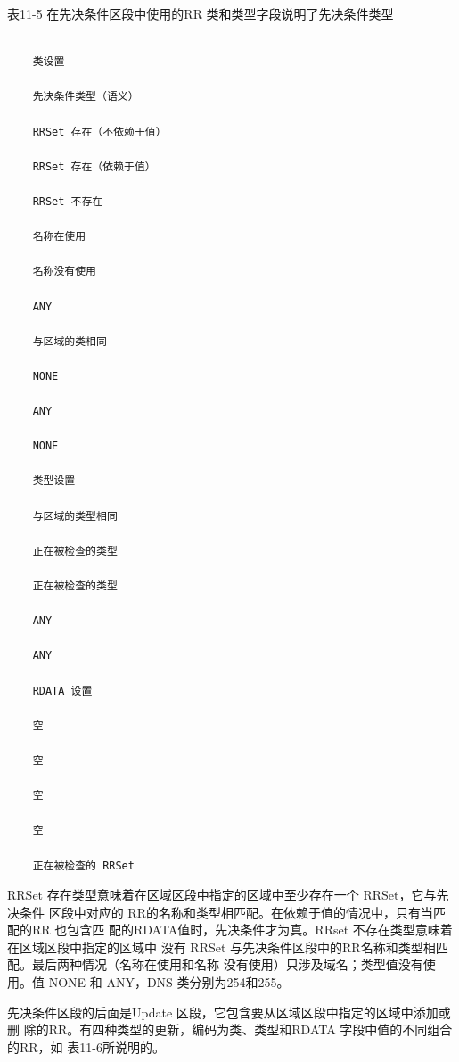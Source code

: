 表11-5 在先决条件区段中使用的RR 类和类型字段说明了先决条件类型
\begin{verbatim}
    
    类设置
    
    先决条件类型（语义）
    
    RRSet 存在（不依赖于值）
    
    RRSet 存在（依赖于值）
    
    RRSet 不存在
    
    名称在使用
    
    名称没有使用
    
    ANY
    
    与区域的类相同
    
    NONE
    
    ANY
    
    NONE
    
    类型设置
    
    与区域的类型相同
    
    正在被检查的类型
    
    正在被检查的类型
    
    ANY
    
    ANY
    
    RDATA 设置
    
    空
    
    空
    
    空
    
    空
    
    正在被检查的 RRSet
\end{verbatim}

RRSet 存在类型意味着在区域区段中指定的区域中至少存在一个 RRSet，它与先决条件
区段中对应的 RR的名称和类型相匹配。在依赖于值的情况中，只有当匹配的RR 也包含匹
配的RDATA值时，先决条件才为真。RRset 不存在类型意味着在区域区段中指定的区域中
没有 RRSet 与先决条件区段中的RR名称和类型相匹配。最后两种情况（名称在使用和名称
没有使用）只涉及域名；类型值没有使用。值 NONE 和 ANY，DNS 类分别为254和255。

先决条件区段的后面是Update 区段，它包含要从区域区段中指定的区域中添加或删
除的RR。有四种类型的更新，编码为类、类型和RDATA 字段中值的不同组合的RR，如
表11-6所说明的。

